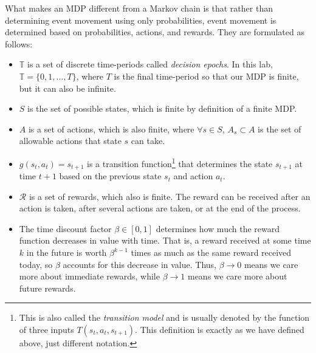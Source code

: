 What makes an MDP different from a Markov chain is that rather than determining event movement using only probabilities, event movement is determined based on probabilities, actions, and rewards.
They are formulated as follows:
\begin{itemize}
    \item $\mathbb{T}$ is a set of discrete time-periods called \emph{decision epochs}.
    In this lab, $\mathbb{T} = \{0,1,\ldots, T\}$, where $T$ is the final time-period so that our MDP is finite, but it can also be infinite.

    \item $S$ is the set of possible states, which is finite by definition of a finite MDP.

    \item $A$ is a set of actions, which is also finite, where $\forall s\in S$, $A_s \subset A$ is the set of allowable actions that state $s$ can take.

    \item $g(s_t,a_t)=s_{t+1}$ is a transition function\footnote{This is also called the \emph{transition model} and is usually denoted by the function of three inputs $T(s_t,a_t,s_{t+1})$. This definition is exactly as we have defined above, just different notation.} that determines the state $s_{t+1}$ at time $t+1$ based on the previous state $s_t$ and action $a_t$.

    \item $\mathcal{R}$ is a set of rewards, which also is finite.
    The reward can be received after an action is taken, after several actions are taken, or at the end of the process.

    \item The time discount factor $\beta \in [0,1]$ determines how much the reward function decreases in value with time.
    That is, a reward received at some time $k$ in the future is worth $\beta^{k-1}$ times as much as the same reward received today, so $\beta$ accounts for this decrease in value.
    Thus, $\beta\to0$ means we care more about immediate rewards, while $\beta\to1$ means we care more about future rewards.

\end{itemize}

